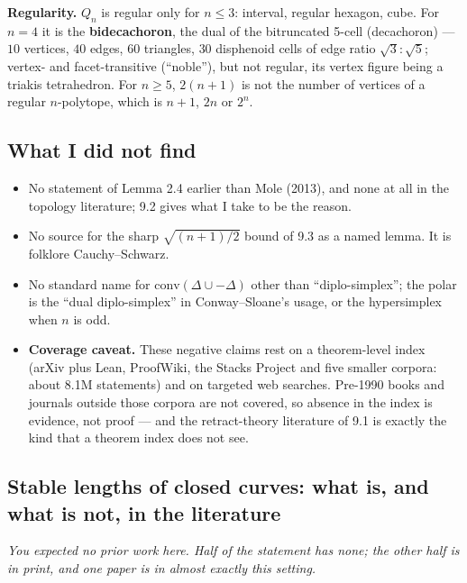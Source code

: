 \documentclass[
]{article}
\newcounter{none} %
\providecommand{\tightlist}{%
  \setlength{\itemsep}{0pt}\setlength{\parskip}{0pt}}
\begin{document}
\textbf{Regularity.} \(Q_n\) is regular only for \(n\le3\): interval,
regular hexagon, cube. For \(n=4\) it is the \textbf{bidecachoron}, the
dual of the bitruncated 5-cell (decachoron) --- \(10\) vertices, \(40\)
edges, \(60\) triangles, \(30\) disphenoid cells of edge ratio
\(\sqrt3:\sqrt5\); vertex- and facet-transitive (``noble''), but not
regular, its vertex figure being a triakis tetrahedron. For \(n\ge5\),
\(2(n+1)\) is not the number of vertices of a regular \(n\)-polytope,
which is \(n+1\), \(2n\) or \(2^n\).

\subsection{What I did not find}\label{what-i-did-not-find-2}

\begin{itemize}
\tightlist
\item
  No statement of Lemma 2.4 earlier than Mole (2013), and none at all in
  the topology literature; 9.2 gives what I take to be the reason.
\item
  No source for the sharp \(\sqrt{(n+1)/2}\) bound of 9.3 as a named
  lemma. It is folklore Cauchy--Schwarz.
\item
  No standard name for \(\mathrm{conv}(\Delta\cup-\Delta)\) other than
  ``diplo-simplex''; the polar is the ``dual diplo-simplex'' in
  Conway--Sloane's usage, or the hypersimplex when \(n\) is odd.
\item
  \textbf{Coverage caveat.} These negative claims rest on a
  theorem-level index (arXiv plus Lean, ProofWiki, the Stacks Project
  and five smaller corpora: about 8.1M statements) and on targeted web
  searches. Pre-1990 books and journals outside those corpora are not
  covered, so absence in the index is evidence, not proof --- and the
  retract-theory literature of 9.1 is exactly the kind that a theorem
  index does not see.
\end{itemize}

\subsection{Stable lengths of closed curves: what is, and what is not,
in the
literature}\label{stable-lengths-of-closed-curves-what-is-and-what-is-not-in-the-literature}

\emph{You expected no prior work here. Half of the statement has none;
the other half is in print, and one paper is in almost exactly this
setting.}
\end{document}

